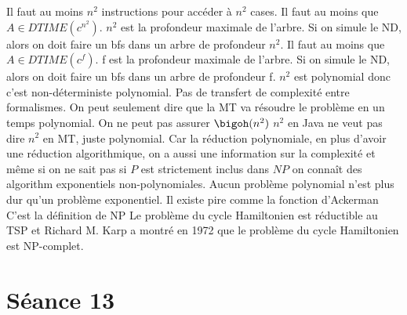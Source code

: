 \begin{mcqs}
  {Il faut au moins $n^2$ instructions pour accéder à $n^2$ cases.}
  {Il faut au moins que $A \in DTIME(c^{n^2})$. $n^2$ est la profondeur maximale de l'arbre. Si on simule le ND, alors on doit faire un bfs dans un arbre de profondeur $n^2$.}
  {Il faut au moins que $A \in DTIME(c^f)$. f est la profondeur maximale de l'arbre. Si on simule le ND, alors on doit faire un bfs dans un arbre de profondeur f.}
  {$n^2$ est polynomial donc c'est non-déterministe polynomial.}
  {Pas de transfert de complexité entre formalismes. On peut seulement dire que la MT va résoudre le problème en un temps polynomial. On ne peut pas assurer $\bigoh(n^{2})$}
  {$n^2$ en Java ne veut pas dire $n^2$ en MT, juste polynomial.}
  {Car la réduction polynomiale, en plus d’avoir une réduction algorithmique, on a aussi une information sur la complexité
  et même si on ne sait pas si $P$ est strictement inclus dans $NP$ on connaît des algorithm exponentiels non-polynomiales.}
  {Aucun problème polynomial n'est plus dur qu'un problème exponentiel.}
  {Il existe pire comme la fonction d'Ackerman}
  {C'est la définition de NP}
  {Le problème du cycle Hamiltonien est réductible au TSP et Richard M. Karp a montré en 1972 que le problème du cycle Hamiltonien est NP-complet.}
\end{mcqs}

\section*{Séance 13}

